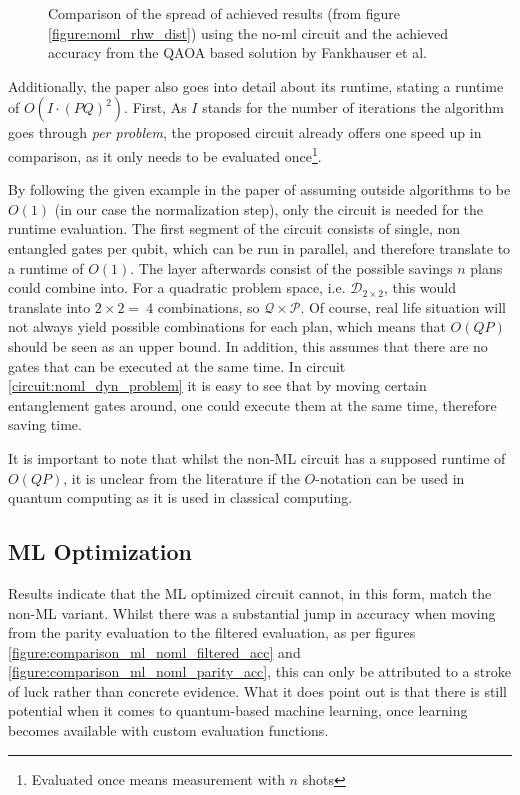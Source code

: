 \begin{figure}[!h]
    \centering
    
    \caption{Comparison of the spread of achieved results (from figure \ref{figure:noml_rhw_dist}) using the no-ml circuit and the achieved accuracy from the QAOA based solution by Fankhauser et al.\cite{fankhauser_multiple_2021} }
    \label{figure:final_comp_noml_qaoa}
\end{figure}


Additionally, the paper also goes into detail about its runtime, stating a runtime of $O(I · (PQ)^2)$. First, As $I$ stands for the number of iterations the algorithm goes through \emph{per problem}, the proposed circuit already offers one speed up in comparison, as it only needs to be evaluated once\footnote{Evaluated once means measurement with $n$ shots}. \par
By following the given example in the paper of assuming outside algorithms to be $O(1)$ (in our case the normalization step), only the circuit is needed for the runtime evaluation. The first segment of the circuit consists of single, non entangled gates per qubit, which can be run in parallel, and therefore translate to a runtime of $O(1)$.
The layer afterwards consist of the possible savings $n$ plans could combine into. For a quadratic problem space, i.e. $\mathcal{D}_{2\times2}$, this would translate into $2\times2 =\ 4$ combinations, so $\mathcal{Q}\times\mathcal{P}$. Of course, real life situation will not always yield possible combinations for each plan, which means that $O(QP)$ should be seen as an upper bound. In addition, this assumes that there are no gates that can be executed at the same time. In circuit \ref{circuit:noml_dyn_problem} it is easy to see that by moving certain entanglement gates around, one could execute them at the same time, therefore saving time. \par
It is important to note that whilst the non-ML circuit has a supposed runtime of $O(QP)$, it is unclear from the literature if the $O$-notation can be used in quantum computing as it is used in classical computing.

\subsection{ML Optimization}
Results indicate that the ML optimized circuit cannot, in this form, match the non-ML variant. Whilst there was a substantial jump in accuracy when moving from the parity evaluation to the filtered evaluation, as per figures \ref{figure:comparison_ml_noml_filtered_acc} and \ref{figure:comparison_ml_noml_parity_acc}, this can only be attributed to a stroke of luck rather than concrete evidence. What it does point out is that there is still potential when it comes to quantum-based machine learning, once learning becomes available with custom evaluation functions. \par


